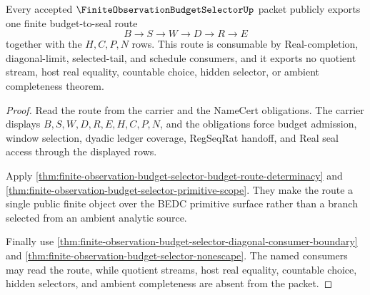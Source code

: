 \begin{theorem}
\label{thm:finite-observation-budget-selector-public-export}
Every accepted $\FiniteObservationBudgetSelectorUp$ packet publicly exports
one finite budget-to-seal route
$$
B \to S \to W \to D \to R \to E
$$
together with the $H,C,P,N$ rows. This route is consumable by
Real-completion, diagonal-limit, selected-tail, and schedule consumers, and
it exports no quotient stream, host real equality, countable choice, hidden
selector, or ambient completeness theorem.
\end{theorem}
\begin{proof}
Read the route from the carrier and the NameCert obligations. The carrier
displays $B,S,W,D,R,E,H,C,P,N$, and the obligations force budget admission,
window selection, dyadic ledger coverage, RegSeqRat handoff, and Real seal
access through the displayed rows.

Apply \autoref{thm:finite-observation-budget-selector-budget-route-determinacy}
and \autoref{thm:finite-observation-budget-selector-primitive-scope}. They
make the route a single public finite object over the BEDC primitive surface
rather than a branch selected from an ambient analytic source.

Finally use \autoref{thm:finite-observation-budget-selector-diagonal-consumer-boundary}
and \autoref{thm:finite-observation-budget-selector-nonescape}. The named
consumers may read the route, while quotient streams, host real equality,
countable choice, hidden selectors, and ambient completeness are absent from
the packet.
\end{proof}


